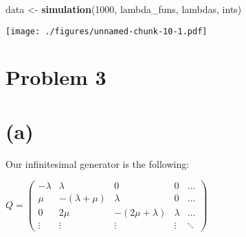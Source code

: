 \documentclass[]{article}
\newenvironment{Shaded}{\begin{snugshade}}{\end{snugshade}}
\newcommand{\CommentTok}[1]{\textcolor[rgb]{0.56,0.35,0.01}{\textit{#1}}}
\newcommand{\ControlFlowTok}[1]{\textcolor[rgb]{0.13,0.29,0.53}{\textbf{#1}}}
\newcommand{\DecValTok}[1]{\textcolor[rgb]{0.00,0.00,0.81}{#1}}
\newcommand{\FloatTok}[1]{\textcolor[rgb]{0.00,0.00,0.81}{#1}}
\newcommand{\KeywordTok}[1]{\textcolor[rgb]{0.13,0.29,0.53}{\textbf{#1}}}
\newcommand{\NormalTok}[1]{#1}
\newcommand{\OperatorTok}[1]{\textcolor[rgb]{0.81,0.36,0.00}{\textbf{#1}}}
\newcommand{\StringTok}[1]{\textcolor[rgb]{0.31,0.60,0.02}{#1}}
\begin{document}
\newpage

\begin{Shaded}
\begin{Highlighting}[]
\NormalTok{data <-}\StringTok{ }\KeywordTok{simulation}\NormalTok{(}\DecValTok{1000}\NormalTok{, lambda_funs, lambdas, ints)}
\end{Highlighting}
\end{Shaded}

\texttt{[image: ./figures/unnamed-chunk-10-1.pdf]}

\begin{Shaded}
\end{Shaded}

\hypertarget{problem-3}{%
\section{Problem 3}\label{problem-3}}

\hypertarget{a-1}{%
\section{(a)}\label{a-1}}

Our infinitesimal generator is the following:

\(Q = \begin{pmatrix} - \lambda & \lambda & 0 & 0 & \dots \\ \mu & - (\lambda + \mu) & \lambda & 0 & \dots \\ 0 & 2 \mu & - (2 \mu + \lambda) & \lambda & \dots \\ \vdots & \vdots & \vdots & \vdots & \ddots \end{pmatrix}\)
\end{document}
